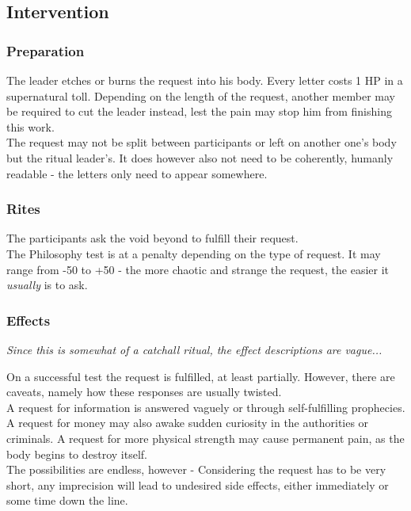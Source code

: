 \subsection*{Intervention}
\subsubsection*{Preparation}
The leader etches or burns the request into his body.
Every letter costs 1 HP in a supernatural toll.
Depending on the length of the request,
another member may be required to cut the leader instead,
lest the pain may stop him from finishing this work.
\\%
The request may not be split between participants
	or left on another one's body but the ritual leader's.
It does however also not need to be coherently, humanly readable
	- the letters only need to appear somewhere.
\subsubsection*{Rites}
The participants ask the void beyond to fulfill their request.
\\%
The Philosophy test is at a penalty depending on the type of request.
It may range from -50 to +50
	- the more chaotic and strange the request,
	the easier it \emph{usually} is to ask.
\\%
\subsubsection*{Effects}
\emph{Since this is somewhat of a catchall ritual, the effect descriptions are vague...}
\par \vspace{-8mm}
On a successful test the request is fulfilled, at least partially.
However, there are caveats, namely how these responses are usually twisted.
\\%
A request for information is answered vaguely or through self-fulfilling prophecies.
A request for money may also awake sudden curiosity in the authorities or criminals.
A request for more physical strength may cause permanent pain,
 as the body begins to destroy itself.
\\%
The possibilities are endless, however -
Considering the request has to be very short,
any imprecision will lead to undesired side effects,
either immediately or some time down the line.
